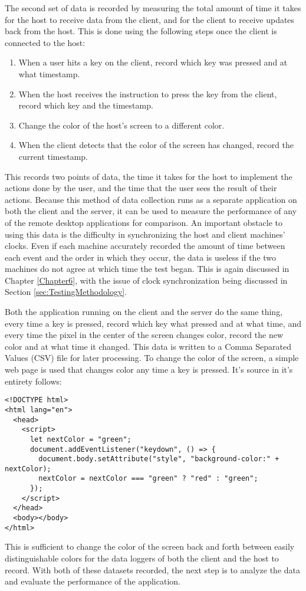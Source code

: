 The second set of data is recorded by measuring the total amount of time it takes for the host to receive data from the client, and for the client to receive updates back from the host.
This is done using the following steps once the client is connected to the host:

\begin{enumerate}
  \item When a user hits a key on the client, record which key was pressed and at what timestamp.
  \item When the host receives the instruction to press the key from the client, record which key and the timestamp.
  \item Change the color of the host's screen to a different color.
  \item When the client detects that the color of the screen has changed, record the current timestamp.
\end{enumerate}

This records two points of data, the time it takes for the host to implement the actions done by the user, and the time that the user sees the result of their actions.
Because this method of data collection runs as a separate application on both the client and the server, it can be used to measure the performance of any of the remote desktop applications for comparison.
An important obstacle to using this data is the difficulty in synchronizing the host and client machines' clocks.
Even if each machine accurately recorded the amount of time between each event and the order in which they occur, the data is useless if the two machines do not agree at which time the test began.
This is again discussed in Chapter \ref{Chapter6}, with the issue of clock synchronization being discussed in Section \ref{sec:TestingMethodology}.

Both the application running on the client and the server do the same thing, every time a key is pressed, record which key what pressed and at what time, and every time the pixel in the center of the screen changes color, record the new color and at what time it changed.
This data is written to a Comma Separated Values (CSV) file for later processing.
To change the color of the screen, a simple web page is used that changes color any time a key is pressed.
It's source in it's entirety follows:

\begin{lstlisting}[style=customhtml,title=\emph{/datalogger/web/index.html}]
<!DOCTYPE html>
<html lang="en">
  <head>
    <script>
      let nextColor = "green";
      document.addEventListener("keydown", () => {
        document.body.setAttribute("style", "background-color:" + nextColor);
        nextColor = nextColor === "green" ? "red" : "green";
      });
    </script>
  </head>
  <body></body>
</html>
\end{lstlisting}

This is sufficient to change the color of the screen back and forth between easily distinguishable colors for the data loggers of both the client and the host to record.
With both of these datasets recorded, the next step is to analyze the data and evaluate the performance of the application.

